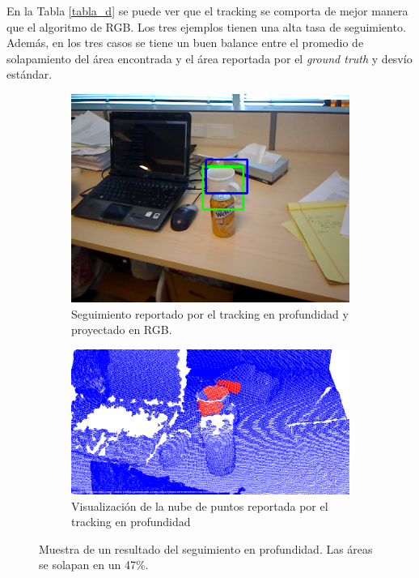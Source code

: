 En la Tabla \ref{tabla_d} se puede ver que el tracking se comporta de mejor manera que el algoritmo de RGB. Los tres ejemplos tienen una alta tasa de seguimiento. Además, en los tres casos se tiene un buen balance entre el promedio de solapamiento del área encontrada y el área reportada por el \textit{ground truth} y desvío estándar.

\begin{figure}
	\centering
	\begin{subfigure}[b]{0.9\textwidth}
		\includegraphics[width=\textwidth]{img/frame_98_taza_rgb.png}
		\caption{Seguimiento reportado por el tracking en profundidad y proyectado en RGB.}
		\label{taza_ocluida_rgb}
	\end{subfigure}
	\quad
	\begin{subfigure}[b]{0.9\textwidth}
		\includegraphics[width=\textwidth]{img/frame_98_taza_pcd.png}
		\caption{Visualización de la nube de puntos reportada por el tracking en profundidad}
		\label{taza_ocluida_pcd}
	\end{subfigure}
	\caption{Muestra de un resultado del seguimiento en profundidad. Las áreas se solapan en un 47\%.}
	\label{taza_ocluida}
\end{figure}

